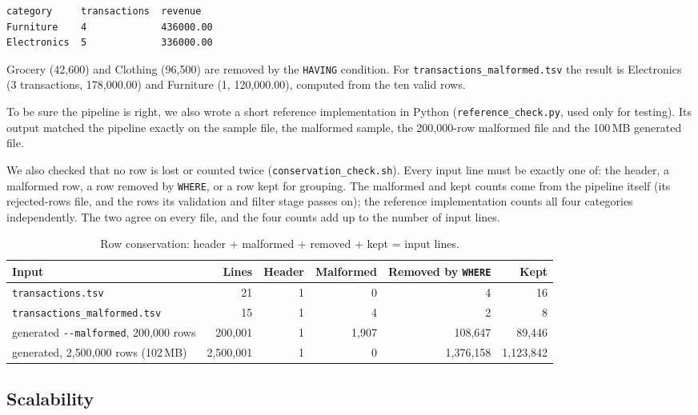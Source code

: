 \documentclass[11pt,a4paper]{article}
\newcommand{\file}[1]{\texttt{#1}}
\begin{document}
\begin{lstlisting}
category     transactions  revenue
Furniture    4             436000.00
Electronics  5             336000.00
\end{lstlisting}

Grocery (42{,}600) and Clothing (96{,}500) are removed by the \texttt{HAVING}
condition. For \file{transactions\_malformed.tsv} the result is Electronics
(3 transactions, 178{,}000.00) and Furniture (1, 120{,}000.00), computed from
the ten valid rows.

To be sure the pipeline is right, we also wrote a short reference
implementation in Python (\file{reference\_check.py}, used only for testing).
Its output matched the pipeline exactly on the sample file, the malformed
sample, the 200{,}000-row malformed file and the 100\,MB generated file.

We also checked that no row is lost or counted twice
(\file{conservation\_check.sh}). Every input line must be exactly one of:
the header, a malformed row, a row removed by \texttt{WHERE}, or a row kept for
grouping. The malformed and kept counts come from the pipeline itself (its
rejected-rows file, and the rows its validation and filter stage passes on);
the reference implementation counts all four categories independently. The
two agree on every file, and the four counts add up to the number of input
lines.

\begin{table}[H]
\centering
\small
\setlength{\tabcolsep}{4pt}
\begin{tabular}{@{}lrrrrr@{}}
\toprule
Input & Lines & Header & Malformed & Removed by \texttt{WHERE} & Kept \\
\midrule
\file{transactions.tsv} & 21 & 1 & 0 & 4 & 16 \\
\file{transactions\_malformed.tsv} & 15 & 1 & 4 & 2 & 8 \\
generated \file{-{}-malformed}, 200{,}000 rows & 200{,}001 & 1 & 1{,}907 & 108{,}647 & 89{,}446 \\
generated, 2{,}500{,}000 rows (102\,MB) & 2{,}500{,}001 & 1 & 0 & 1{,}376{,}158 & 1{,}123{,}842 \\
\bottomrule
\end{tabular}
\caption{Row conservation: header + malformed + removed + kept = input lines.}
\label{tab:conservation}
\end{table}

\subsection{Scalability}
\end{document}
